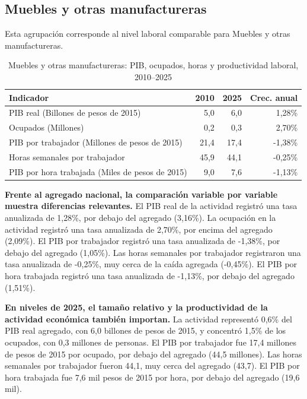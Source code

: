 \subsection{Muebles y otras manufactureras}

Esta agrupación corresponde al nivel laboral comparable para Muebles y otras manufactureras.

\begin{table}[H]
\centering
\caption{Muebles y otras manufactureras: PIB, ocupados, horas y productividad laboral, 2010--2025}
\label{tab:agg25_c06_productividad}
\small
\begin{tabular}{lrrr}
\toprule
Indicador & 2010 & 2025 & Crec. anual \\
\midrule
PIB real  (Billones de pesos de 2015) & 5,0 & 6,0 & 1,28\% \\
Ocupados (Millones) & 0,2 & 0,3 & 2,70\% \\
PIB por trabajador (Millones de pesos de 2015) & 21,4 & 17,4 & -1,38\% \\
Horas semanales por trabajador & 45,9 & 44,1 & -0,25\% \\
PIB por hora trabajada (Miles de pesos de 2015) & 9,0 & 7,6 & -1,13\% \\
\bottomrule
\end{tabular}
\end{table}

\textbf{Frente al agregado nacional, la comparación variable por variable muestra diferencias relevantes.} El PIB real de la actividad registró una tasa anualizada de 1,28\%, por debajo del agregado (3,16\%). La ocupación en la actividad registró una tasa anualizada de 2,70\%, por encima del agregado (2,09\%). El PIB por trabajador registró una tasa anualizada de -1,38\%, por debajo del agregado (1,05\%). Las horas semanales por trabajador registraron una tasa anualizada de -0,25\%, muy cerca de la caída agregada (-0,45\%). El PIB por hora trabajada registró una tasa anualizada de -1,13\%, por debajo del agregado (1,51\%).

\textbf{En niveles de 2025, el tamaño relativo y la productividad de la actividad económica también importan.} La actividad representó 0,6\% del PIB real agregado, con 6,0 billones de pesos de 2015, y concentró 1,5\% de los ocupados, con 0,3 millones de personas. El PIB por trabajador fue 17,4 millones de pesos de 2015 por ocupado, por debajo del agregado (44,5 millones). Las horas semanales por trabajador fueron 44,1, muy cerca del agregado (43,7). El PIB por hora trabajada fue 7,6 mil pesos de 2015 por hora, por debajo del agregado (19,6 mil).

